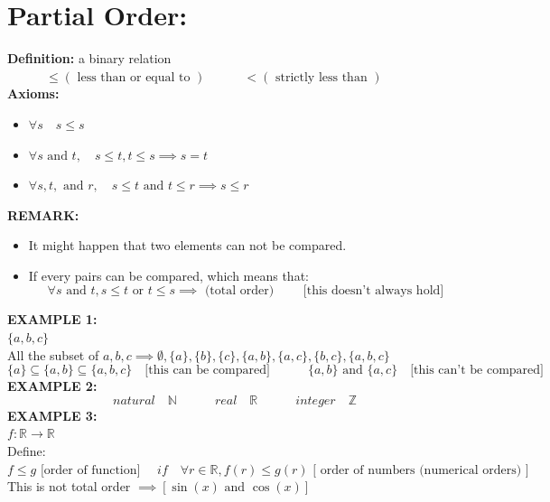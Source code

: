 \documentclass [9 pt]{article}
\theoremstyle{definition}
\begin{document}
\section*{Partial Order:}
\textbf{Definition:} a binary relation $\quad \quad \quad \leq (\text{ less than or equal to  }) \quad \quad \quad < (\text{ strictly less than })$\\
\newline
\textbf{Axioms:}
\begin{itemize}
	\item $\forall s\quad s \leq s$\\
	\item $\forall s \text{ and } t,\quad s \leq t, t \leq s \implies s = t$\\
	\item $\forall s,  t, \text{ and } r, \quad s\leq t \text{ and } t\leq r \implies s \leq r$
\end{itemize}
\newpage
\textbf{REMARK:}
\begin{itemize}
	\item It might happen that two elements can not be compared.
	\item If every pairs can be compared, which means that:
	$$ \forall s \text{ and } t, s \leq t \text{ or } t \leq s \implies \text{ (total order) } \quad \quad \text{[this doesn't always hold]}$$
\end{itemize}
\textbf{EXAMPLE 1:}\\
$\{a, b, c\}$\\
All the subset of ${a, b, c} \implies \emptyset, \{a\}, \{b\}, \{c\}, \{a, b\}, \{a, c\}, \{ b, c\}, \{a, b, c\} $ \\
$$ \{ a \} \subseteq \{ a, b \} \subseteq \{ a, b, c \}  \quad \big[ \text{this can be compared} \big]\quad \quad \quad \{ a, b\} \text{ and } \{a, c\}  \quad \big[\text{this can't be compared} \big]  $$
\newline
\textbf{EXAMPLE 2:}\\
$$natural \quad \mathbb{N}\quad \quad \quad real \quad \mathbb{R}\quad \quad \quad integer \quad \mathbb{Z}    $$
\newline
\textbf{EXAMPLE 3:}\\
$ f: \mathbb{R} \to \mathbb{R} $\\
Define: $ f \leq g \text{ [order of function] } \quad  if \quad \forall r \in \mathbb{R}, f(r) \leq g(r) \text{ [ order of numbers (numerical orders) ] }   $\\
This is not total order $\implies [\sin(x) \text{ and } \cos(x)]$ 
\end{document}
